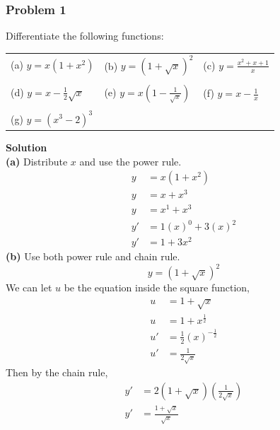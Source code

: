 \documentclass[hidelinks, a4paper, 12pt]{article}
\newcommand{\bd}{\textbf}
\newcommand{\n}{\\[\baselineskip]}
\begin{document}
            \subsubsection{Problem 1}
                Differentiate the following functions:
                \begin{center}
                    \begin{tabularx}{\textwidth} {
                        X X X}
                        (a) $y = x(1+x^2)$ & (b) $y = (1+\sqrt{x})^2$ & (c) $y = \frac{x^2+x+1}{x}$\\ 
                        \\
                        (d) $y = x - \frac{1}{2}\sqrt{x}$  & (e) $y = x(1-\frac{1}{\sqrt{x}})$ & (f) $y = x - \frac{1}{x}$\\
                        \\
                        (g) $y = (x^3-2)^3$
                    \end{tabularx}
                \end{center}
                \medskip
                \bd{Solution}\n
                \bd{(a)} Distribute $x$ and use the power rule.
                \[\begin{split}
                    y &= x(1+x^2)\\
                    y &= x+x^3\\
                    y &= x^1 + x^3\\
                    y' &= 1(x)^0 + 3(x)^2\\
                    y' &= 1+3x^2 
                \end{split}\]
                \bd{(b)} Use both power rule and chain rule.
                \[y = (1+\sqrt{x})^2\]
                We can let $u$ be the equation inside the square function,
                \[\begin{split}
                    u &= 1+\sqrt{x}\\
                    u &= 1 + x^{\frac{1}{2}}\\
                    u' &= \frac{1}{2}(x)^{-\frac{1}{2}}\\
                    u' &= \frac{1}{2\sqrt{x}}
                \end{split}\]
                Then by the chain rule,
                \[\begin{split}
                    y' &= 2(1+\sqrt{x})\left(\frac{1}{2\sqrt{x}}\right)\\
                    y' &= \frac{1+\sqrt{x}}{\sqrt{x}}
                \end{split}\]\n
\end{document}
